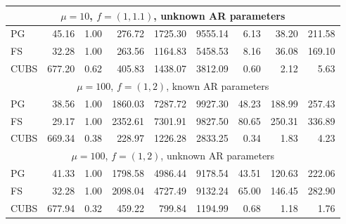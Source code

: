 \documentclass[11pt]{article}
\begin{document}
\begin{table}
\begin{tabular}{l r r r r r r r r }
 \\ %

\hline
 \multicolumn{9}{c}{$\mu=10$, $f = (1,1.1)$, unknown AR parameters} \\
\hline
             PG   &    45.16 &     1.00 &    276.72 &   1725.30 &   9555.14 &      6.13 &     38.20 &    211.58 \\ 
             FS   &    32.28 &     1.00 &    263.56 &   1164.83 &   5458.53 &      8.16 &     36.08 &    169.10 \\ 
           CUBS   &   677.20 &     0.62 &    405.83 &   1438.07 &   3812.09 &      0.60 &      2.12 &      5.63
 \\ %

\hline
 \multicolumn{9}{c}{$\mu=100$, $f = (1,2)$, known AR parameters} \\
\hline
            PG  &    38.56 &     1.00 &   1860.03 &   7287.72 &   9927.30 &     48.23 &    188.99 &    257.43 \\ 
            FS  &    29.17 &     1.00 &   2352.61 &   7301.91 &   9827.50 &     80.65 &    250.31 &    336.89 \\ 
          CUBS  &   669.34 &     0.38 &    228.97 &   1226.28 &   2833.25 &      0.34 &      1.83 &      4.23

 \\ %

\hline
 \multicolumn{9}{c}{$\mu=100$, $f = (1,2)$, unknown AR parameters} \\
\hline
             PG   &    41.33 &     1.00 &   1798.58 &   4986.44 &   9178.54 &     43.51 &    120.63 &    222.06 \\ 
             FS   &    32.28 &     1.00 &   2098.04 &   4727.49 &   9132.24 &     65.00 &    146.45 &    282.90 \\ 
           CUBS   &   677.94 &     0.32 &    459.22 &    799.84 &   1194.99 &      0.68 &      1.18 &      1.76
 \\ %


\end{tabular}
\end{table}
\end{document}

